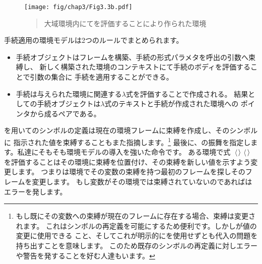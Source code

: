 \begin{figure}[tb]
\label{Figure 3.3}
\centering
\begin{comment}
\heading{Figure 3.3:} Environment created by evaluating
\code{(square 5)} in the global environment.

\begin{example}
          +------------------------------------+
          | other variables                    |
global -->|                                    |
env       | square: --+                        |
          +-----------|---------------------+--+
                      |       ^             ^
(square 5)            |       |             |
                      V       |             |
                  .---.---.   |         +---+--+
                  | O | O-+---+   E1 -->| x: 5 |
                  `-|-^---'             +------+
                    |
                    V
                  parameters: x
                  body: (* x x)
\end{example}
\end{comment}
\texttt{[image: fig/chap3/Fig3.3b.pdf]}
\begin{quote}
 大域環境内にてを評価することにより作られた環境
\end{quote}
\end{figure}

\noindent
手続適用の環境モデルは2つのルールでまとめられます。

\begin{itemize}

\item
手続オブジェクトはフレームを構築、手続の形式パラメタを呼出の引数へ束縛し、
新しく構築された環境のコンテキストにて手続のボディを評価することで引数の集合に
手続を適用することができる。

\item
手続は与えられた環境に関連する\( \lambda \)式を評価することで作成される。
結果としての手続オブジェクトは\( \lambda \)式のテキストと手続が作成された環境への
ポインタから成るペアである。

\end{itemize}

\noindent
{}を用いてのシンボルの定義は現在の環境フレームに束縛を作成し、そのシンボルに
指示された値を束縛することもまた指摘します。\footnote{
もし既にその変数への束縛が現在のフレームに存在する場合、束縛は変更されます。
これはシンボルの再定義を可能にするため便利です。しかしが値の変更に使用できる
こと、そしてこれが明示的にを使用せずとも代入の問題を持ち出すことを意味します。
このため既存のシンボルの再定義に対しエラーや警告を発することを好む人達もいます。}
最後に、の振舞を指定します。私達にそもそも環境モデルの導入を強いた命令です。
ある環境で式
\( \;\langle \)\( \kern0.08em\rangle \)\( \;\langle \)\( \kern0.08em\rangle \)\code{)}
を評価することはその環境に束縛を位置付け、その束縛を新しい値を示すよう変更します。
つまりは環境でその変数の束縛を持つ最初のフレームを探しそのフレームを変更します。
もし変数がその環境では束縛されていないのであればはエラーを発します。



